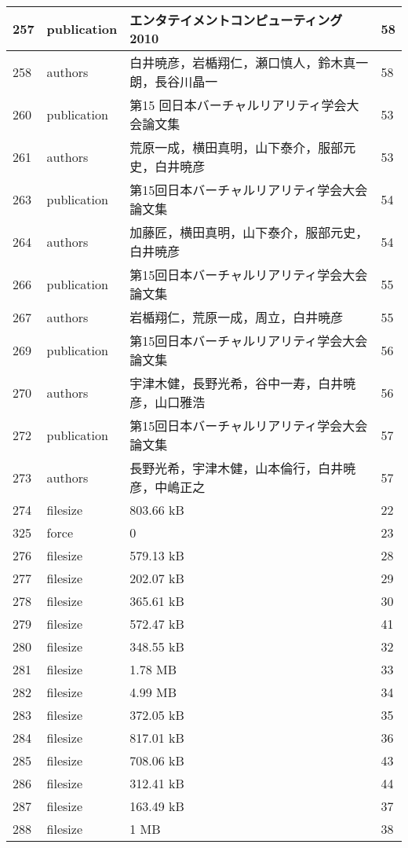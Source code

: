 \begin{longtable}{|l|l|l|l|}
257 & publication & エンタテイメントコンピューティング2010 & 58 \\ \hline 
258 & authors & 白井暁彦，岩楯翔仁，瀬口慎人，鈴木真一朗，長谷川晶一 & 58 \\ \hline 
260 & publication & 第15 回日本バーチャルリアリティ学会大会論文集 & 53 \\ \hline 
261 & authors & 荒原一成，横田真明，山下泰介，服部元史，白井暁彦 & 53 \\ \hline 
263 & publication & 第15回日本バーチャルリアリティ学会大会論文集 & 54 \\ \hline 
264 & authors & 加藤匠，横田真明，山下泰介，服部元史，白井暁彦 & 54 \\ \hline 
266 & publication & 第15回日本バーチャルリアリティ学会大会論文集 & 55 \\ \hline 
267 & authors & 岩楯翔仁，荒原一成，周立，白井暁彦 & 55 \\ \hline 
269 & publication & 第15回日本バーチャルリアリティ学会大会論文集 & 56 \\ \hline 
270 & authors & 宇津木健，長野光希，谷中一寿，白井暁彦，山口雅浩 & 56 \\ \hline 
272 & publication & 第15回日本バーチャルリアリティ学会大会論文集 & 57 \\ \hline 
273 & authors & 長野光希，宇津木健，山本倫行，白井暁彦，中嶋正之 & 57 \\ \hline 
274 & filesize & 803.66 kB & 22 \\ \hline 
325 & force & 0 & 23 \\ \hline 
276 & filesize & 579.13 kB & 28 \\ \hline 
277 & filesize & 202.07 kB & 29 \\ \hline 
278 & filesize & 365.61 kB & 30 \\ \hline 
279 & filesize & 572.47 kB & 41 \\ \hline 
280 & filesize & 348.55 kB & 32 \\ \hline 
281 & filesize & 1.78 MB & 33 \\ \hline 
282 & filesize & 4.99 MB & 34 \\ \hline 
283 & filesize & 372.05 kB & 35 \\ \hline 
284 & filesize & 817.01 kB & 36 \\ \hline 
285 & filesize & 708.06 kB & 43 \\ \hline 
286 & filesize & 312.41 kB & 44 \\ \hline 
287 & filesize & 163.49 kB & 37 \\ \hline 
288 & filesize & 1 MB & 38 \\ \hline 

\end{longtable}
